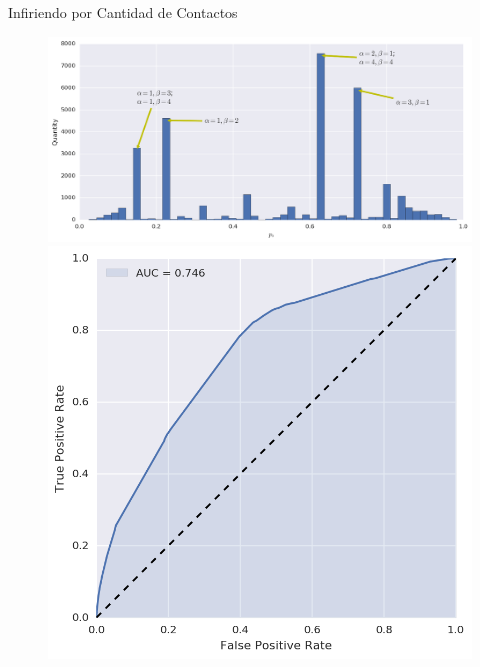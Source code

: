 \documentclass[usenames,dvipsnames,table]{beamer}
\begin{document}
\begin{frame}{Infiriendo por Cantidad de Contactos}

	\begin{figure}
		\includegraphics[width=\framewidth, height=.37\textheight, keepaspectratio]{bayes/hist_contacts.png} \\
		\includegraphics[width=.49\framewidth, height=.37\textheight, keepaspectratio]{bayes/roc_contacts.png}

\end{figure}
\end{frame}
\end{document}
